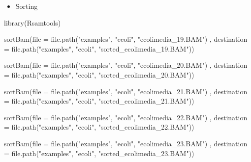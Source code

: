 \documentclass[
]{book}
\newenvironment{Shaded}{\begin{snugshade}}{\end{snugshade}}
\newcommand{\AttributeTok}[1]{\textcolor[rgb]{0.77,0.63,0.00}{#1}}
\newcommand{\FunctionTok}[1]{\textcolor[rgb]{0.00,0.00,0.00}{#1}}
\newcommand{\NormalTok}[1]{#1}
\newcommand{\StringTok}[1]{\textcolor[rgb]{0.31,0.60,0.02}{#1}}
\providecommand{\tightlist}{%
  \setlength{\itemsep}{0pt}\setlength{\parskip}{0pt}}
\begin{document}
\begin{itemize}
\tightlist
\item
  Sorting
\end{itemize}

\begin{Shaded}
\begin{Highlighting}[]
\FunctionTok{library}\NormalTok{(Rsamtools)}

\FunctionTok{sortBam}\NormalTok{(}\AttributeTok{file =} \FunctionTok{file.path}\NormalTok{(}\StringTok{"examples"}\NormalTok{, }\StringTok{"ecoli"}\NormalTok{, }\StringTok{"ecolimedia\_19.BAM"}\NormalTok{)}
\NormalTok{        , }\AttributeTok{destination =} \FunctionTok{file.path}\NormalTok{(}\StringTok{"examples"}\NormalTok{, }\StringTok{"ecoli"}\NormalTok{, }\StringTok{"sorted\_ecolimedia\_19.BAM"}\NormalTok{))}

\FunctionTok{sortBam}\NormalTok{(}\AttributeTok{file =} \FunctionTok{file.path}\NormalTok{(}\StringTok{"examples"}\NormalTok{, }\StringTok{"ecoli"}\NormalTok{, }\StringTok{"ecolimedia\_20.BAM"}\NormalTok{)}
\NormalTok{        , }\AttributeTok{destination =} \FunctionTok{file.path}\NormalTok{(}\StringTok{"examples"}\NormalTok{, }\StringTok{"ecoli"}\NormalTok{, }\StringTok{"sorted\_ecolimedia\_20.BAM"}\NormalTok{))}

\FunctionTok{sortBam}\NormalTok{(}\AttributeTok{file =} \FunctionTok{file.path}\NormalTok{(}\StringTok{"examples"}\NormalTok{, }\StringTok{"ecoli"}\NormalTok{, }\StringTok{"ecolimedia\_21.BAM"}\NormalTok{)}
\NormalTok{        , }\AttributeTok{destination =} \FunctionTok{file.path}\NormalTok{(}\StringTok{"examples"}\NormalTok{, }\StringTok{"ecoli"}\NormalTok{, }\StringTok{"sorted\_ecolimedia\_21.BAM"}\NormalTok{))}

\FunctionTok{sortBam}\NormalTok{(}\AttributeTok{file =} \FunctionTok{file.path}\NormalTok{(}\StringTok{"examples"}\NormalTok{, }\StringTok{"ecoli"}\NormalTok{, }\StringTok{"ecolimedia\_22.BAM"}\NormalTok{)}
\NormalTok{        , }\AttributeTok{destination =} \FunctionTok{file.path}\NormalTok{(}\StringTok{"examples"}\NormalTok{, }\StringTok{"ecoli"}\NormalTok{, }\StringTok{"sorted\_ecolimedia\_22.BAM"}\NormalTok{))}

\FunctionTok{sortBam}\NormalTok{(}\AttributeTok{file =} \FunctionTok{file.path}\NormalTok{(}\StringTok{"examples"}\NormalTok{, }\StringTok{"ecoli"}\NormalTok{, }\StringTok{"ecolimedia\_23.BAM"}\NormalTok{)}
\NormalTok{        , }\AttributeTok{destination =} \FunctionTok{file.path}\NormalTok{(}\StringTok{"examples"}\NormalTok{, }\StringTok{"ecoli"}\NormalTok{, }\StringTok{"sorted\_ecolimedia\_23.BAM"}\NormalTok{))}


\end{Highlighting}
\end{Shaded}
\end{document}
